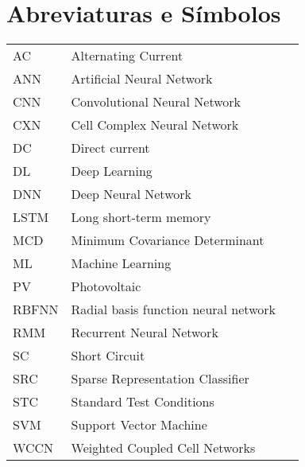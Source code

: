 \chapter*{Abreviaturas e Símbolos}

\begin{flushleft}
\begin{tabular}{l p{0.8\linewidth}}
AC         & Alternating Current \\
ANN        & Artificial Neural Network \\
CNN        & Convolutional Neural Network \\
CXN       & Cell Complex Neural Network \\
DC      & Direct current \\
DL      & Deep Learning \\
DNN      & Deep Neural Network \\
LSTM      & Long short-term memory \\
MCD      & Minimum Covariance Determinant\\
ML          & Machine Learning \\
PV      & Photovoltaic \\
RBFNN   & Radial basis function neural network \\
RMM     & Recurrent Neural Network \\
SC      & Short Circuit \\
SRC     & Sparse Representation Classifier \\
STC      & Standard Test Conditions \\
SVM         & Support Vector Machine \\
WCCN    & Weighted Coupled Cell Networks
\end{tabular}
\end{flushleft}
